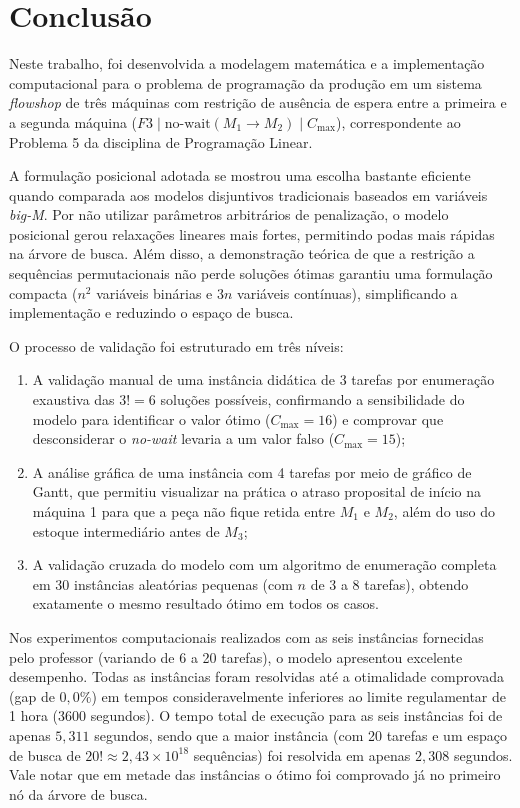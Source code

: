 \section{Conclusão}
\label{sec:conclusao}

Neste trabalho, foi desenvolvida a modelagem matemática e a implementação computacional para o problema de programação da produção em um sistema \textit{flowshop} de três máquinas com restrição de ausência de espera entre a primeira e a segunda máquina ($F3 \mid \text{no-wait}(M_1 \to M_2) \mid C_{\max}$), correspondente ao Problema 5 da disciplina de Programação Linear.

A formulação posicional adotada se mostrou uma escolha bastante eficiente quando comparada aos modelos disjuntivos tradicionais baseados em variáveis \textit{big-M}. Por não utilizar parâmetros arbitrários de penalização, o modelo posicional gerou relaxações lineares mais fortes, permitindo podas mais rápidas na árvore de busca. Além disso, a demonstração teórica de que a restrição a sequências permutacionais não perde soluções ótimas garantiu uma formulação compacta ($n^2$ variáveis binárias e $3n$ variáveis contínuas), simplificando a implementação e reduzindo o espaço de busca.

O processo de validação foi estruturado em três níveis:
\begin{enumerate}
    \item A validação manual de uma instância didática de 3 tarefas por enumeração exaustiva das $3! = 6$ soluções possíveis, confirmando a sensibilidade do modelo para identificar o valor ótimo ($C_{\max} = 16$) e comprovar que desconsiderar o \textit{no-wait} levaria a um valor falso ($C_{\max} = 15$);
    \item A análise gráfica de uma instância com 4 tarefas por meio de gráfico de Gantt, que permitiu visualizar na prática o atraso proposital de início na máquina 1 para que a peça não fique retida entre $M_1$ e $M_2$, além do uso do estoque intermediário antes de $M_3$;
    \item A validação cruzada do modelo com um algoritmo de enumeração completa em 30 instâncias aleatórias pequenas (com $n$ de 3 a 8 tarefas), obtendo exatamente o mesmo resultado ótimo em todos os casos.
\end{enumerate}

Nos experimentos computacionais realizados com as seis instâncias fornecidas pelo professor (variando de 6 a 20 tarefas), o modelo apresentou excelente desempenho. Todas as instâncias foram resolvidas até a otimalidade comprovada (gap de $0{,}0\%$) em tempos consideravelmente inferiores ao limite regulamentar de 1 hora (3600 segundos). O tempo total de execução para as seis instâncias foi de apenas $5{,}311$ segundos, sendo que a maior instância (com 20 tarefas e um espaço de busca de $20! \approx 2{,}43 \times 10^{18}$ sequências) foi resolvida em apenas $2{,}308$ segundos. Vale notar que em metade das instâncias o ótimo foi comprovado já no primeiro nó da árvore de busca.

